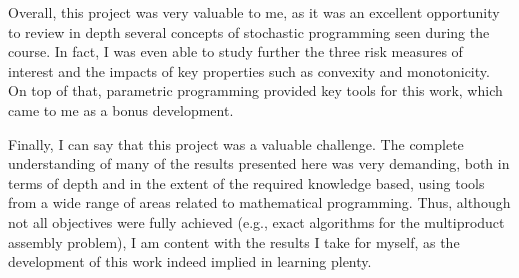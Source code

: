 \documentclass[12pt]{article}
\begin{document}
Overall, this project was very valuable to me, as it was an excellent opportunity to review in depth several concepts of stochastic programming seen during the course.
In fact, I was even able to study further the three risk measures of interest and the impacts of key properties such as convexity and monotonicity.
On top of that, parametric programming provided key tools for this work, which came to me as a bonus development.

Finally, I can say that this project was a valuable challenge.
The complete understanding of many of the results presented here was very demanding, both in terms of depth and in the extent of the required knowledge based, using tools from a wide range of areas related to mathematical programming.
Thus, although not all objectives were fully achieved (e.g., exact algorithms for the multiproduct assembly problem), I am content with the results I take for myself, as the development of this work indeed implied in learning plenty.



% 
\printbibliography
    
\end{document}
